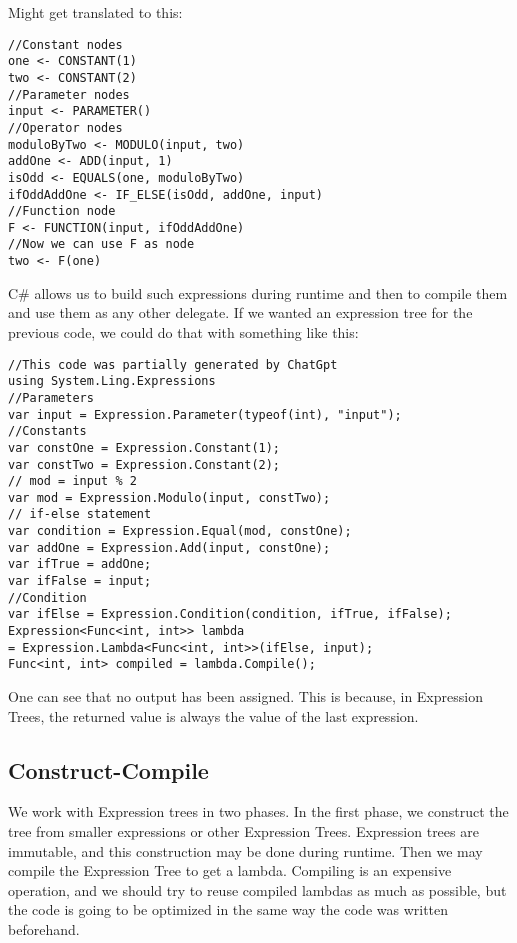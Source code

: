 Might get translated to this:
\begin{lstlisting}
//Constant nodes
one <- CONSTANT(1)
two <- CONSTANT(2)
//Parameter nodes
input <- PARAMETER()
//Operator nodes
moduloByTwo <- MODULO(input, two)
addOne <- ADD(input, 1)
isOdd <- EQUALS(one, moduloByTwo)
ifOddAddOne <- IF_ELSE(isOdd, addOne, input)
//Function node
F <- FUNCTION(input, ifOddAddOne)
//Now we can use F as node
two <- F(one)
\end{lstlisting}
    

C\# allows us to build such expressions during runtime and then to compile them and use them as any other delegate.
If we wanted an expression tree for the previous code, we could do that with something like this:

\begin{lstlisting}
//This code was partially generated by ChatGpt
using System.Ling.Expressions
//Parameters
var input = Expression.Parameter(typeof(int), "input");
//Constants
var constOne = Expression.Constant(1);
var constTwo = Expression.Constant(2);
// mod = input % 2 
var mod = Expression.Modulo(input, constTwo);
// if-else statement
var condition = Expression.Equal(mod, constOne);
var addOne = Expression.Add(input, constOne);
var ifTrue = addOne;
var ifFalse = input;
//Condition
var ifElse = Expression.Condition(condition, ifTrue, ifFalse);
Expression<Func<int, int>> lambda 
= Expression.Lambda<Func<int, int>>(ifElse, input);
Func<int, int> compiled = lambda.Compile();
\end{lstlisting}

One can see that no output has been assigned. This is because, in Expression Trees, the returned value is always the value of the last expression. 


\iffalse
\digraph{expressionTree1}{
  const_1 -> b0;
  input -> "+"
  const_1 -> "+"
  input -> "\%"
  "\%" -> "=="
  const_1 -> "=="
  "==" -> if [label = "check"]
  input -> if [label = "check is false"]
  "+" -> if [label = "check is true"]
}
\fi

\subsection{Construct-Compile}
We work with Expression trees in two phases. In the first phase, we construct the tree from smaller expressions or other Expression Trees. Expression trees are immutable, and this construction may be done during runtime. 
Then we may compile the Expression Tree to get a lambda. Compiling is an expensive operation, and we should try to reuse compiled lambdas as much as possible, but the code is going to be optimized in the same way the code was written beforehand. 

